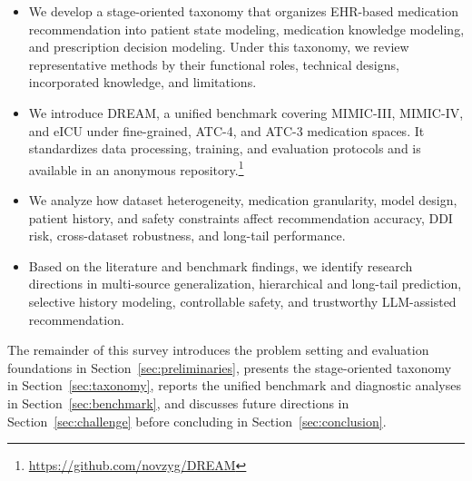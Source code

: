 \documentclass[manuscript,review]{acmart}
\begin{document}

\begin{itemize}
\item We develop a stage-oriented taxonomy that organizes EHR-based medication recommendation into patient state modeling, medication knowledge modeling, and prescription decision modeling. Under this taxonomy, we review representative methods by their functional roles, technical designs, incorporated knowledge, and limitations.

\item We introduce DREAM, a unified benchmark covering MIMIC-III, MIMIC-IV, and eICU under fine-grained, ATC-4, and ATC-3 medication spaces. It standardizes data processing, training, and evaluation protocols and is available in an anonymous repository.\footnote{\url{https://github.com/novzyg/DREAM}}

\item We analyze how dataset heterogeneity, medication granularity, model design, patient history, and safety constraints affect recommendation accuracy, DDI risk, cross-dataset robustness, and long-tail performance.

\item Based on the literature and benchmark findings, we identify research directions in multi-source generalization, hierarchical and long-tail prediction, selective history modeling, controllable safety, and trustworthy LLM-assisted recommendation.
\end{itemize}

The remainder of this survey introduces the problem setting and evaluation foundations in Section~\ref{sec:preliminaries}, presents the stage-oriented taxonomy in Section~\ref{sec:taxonomy}, reports the unified benchmark and diagnostic analyses in Section~\ref{sec:benchmark}, and discusses future directions in Section~\ref{sec:challenge} before concluding in Section~\ref{sec:conclusion}.
\end{document}
